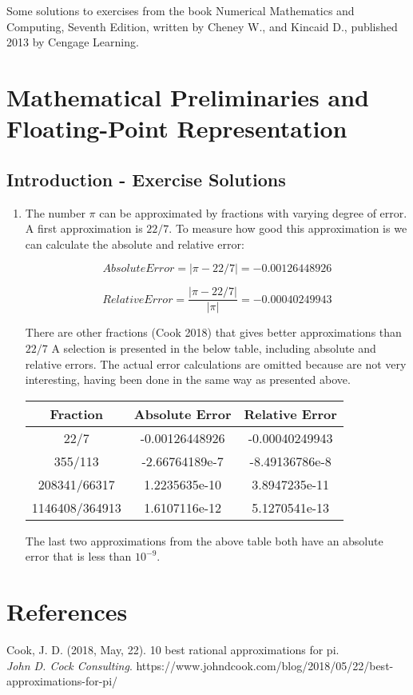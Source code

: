 \documentclass[10pt]{article}
\begin{document}
Some solutions to exercises from the book Numerical Mathematics and Computing, Seventh Edition, written by Cheney W., and Kincaid D., published 2013 by Cengage Learning.

\section[Mathematical Preliminaries and Floating-Point Representation]
{Mathematical Preliminaries and\\ Floating-Point Representation}


\subsection{Introduction - Exercise Solutions}

\begin{enumerate}

    \item The number \( \pi \) can be approximated by fractions with varying degree of error. A first approximation is \( 22 / 7 \). To measure how good this approximation is we can calculate the absolute and relative error:
    
    \[ Absolute Error = \left| \pi - 22 / 7 \right| = -0.00126448926 \]

    \[ Relative Error = \dfrac{\left| \pi - 22 / 7 \right|}{\left| \pi \right|} = -0.00040249943 \]

    There are other fractions (Cook 2018) that gives better approximations than \( 22 / 7 \) A selection is presented in the below table, including absolute and relative errors. The actual error calculations are omitted because are not very interesting,  having been done in the same way as presented above.

   \begin{center}
    \begin{tabular}{c c c }
        \hline
        Fraction & Absolute Error & Relative Error \\
        \hline
        22/7 & -0.00126448926 & -0.00040249943 \\
        355/113 & -2.66764189e-7 & -8.49136786e-8 \\
        208341/66317 & 1.2235635e-10 & 3.8947235e-11 \\
        1146408/364913 & 1.6107116e-12 & 5.1270541e-13 \\ 
        \hline
    \end{tabular}
   \end{center}

   The last two approximations from the above table both have an absolute error that is less than \( 10^{-9} \).

\end{enumerate}

\section{References}

Cook, J. D. (2018, May, 22). 10 best rational approximations for pi.\\
\textit{John D. Cock Consulting}. https://www.johndcook.com/blog/2018/05/22/best-approximations-for-pi/
\end{document}
